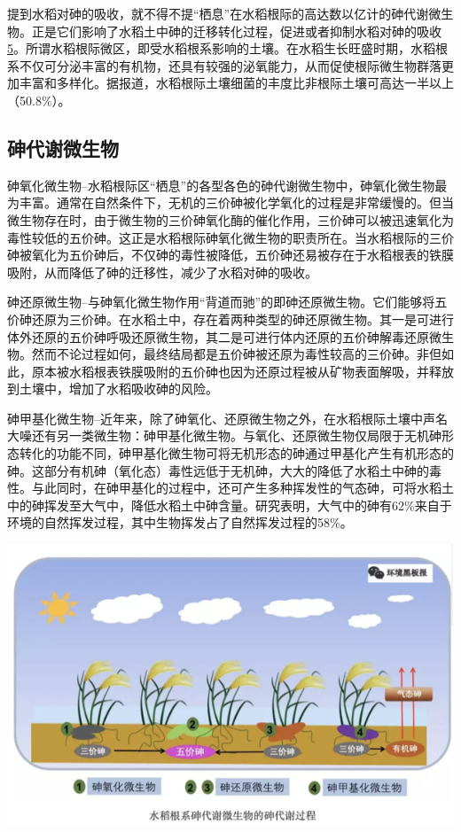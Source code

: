 \documentclass[]{book}
\begin{document}
提到水稻对砷的吸收，就不得不提``栖息''在水稻根际的高达数以亿计的砷代谢微生物。正是它们影响了水稻土中砷的迁移转化过程，促进或者抑制水稻对砷的吸收\href{Bi\%20H,\%20Huang\%20X,\%20et\%20al.\%20Small\%202014,\%2010,\%203544.}{5}。所谓水稻根际微区，即受水稻根系影响的土壤。在水稻生长旺盛时期，水稻根系不仅可分泌丰富的有机物，还具有较强的泌氧能力，从而促使根际微生物群落更加丰富和多样化。据报道，水稻根际土壤细菌的丰度比非根际土壤可高达一半以上（50.8\%）。

\subsection{砷代谢微生物}

砷氧化微生物--水稻根际区``栖息''的各型各色的砷代谢微生物中，砷氧化微生物最为丰富。通常在自然条件下，无机的三价砷被化学氧化的过程是非常缓慢的。但当微生物存在时，由于微生物的三价砷氧化酶的催化作用，三价砷可以被迅速氧化为毒性较低的五价砷。这正是水稻根际砷氧化微生物的职责所在。当水稻根际的三价砷被氧化为五价砷后，不仅砷的毒性被降低，五价砷还易被存在于水稻根表的铁膜吸附，从而降低了砷的迁移性，减少了水稻对砷的吸收。

砷还原微生物--与砷氧化微生物作用``背道而驰''的即砷还原微生物。它们能够将五价砷还原为三价砷。在水稻土中，存在着两种类型的砷还原微生物。其一是可进行体外还原的五价砷呼吸还原微生物，其二是可进行体内还原的五价砷解毒还原微生物。然而不论过程如何，最终结局都是五价砷被还原为毒性较高的三价砷。非但如此，原本被水稻根表铁膜吸附的五价砷也因为还原过程被从矿物表面解吸，并释放到土壤中，增加了水稻吸收砷的风险。

砷甲基化微生物--近年来，除了砷氧化、还原微生物之外，在水稻根际土壤中声名大噪还有另一类微生物：砷甲基化微生物。与氧化、还原微生物仅局限于无机砷形态转化的功能不同，砷甲基化微生物可将无机形态的砷通过甲基化产生有机形态的砷。这部分有机砷（氧化态）毒性远低于无机砷，大大的降低了水稻土中砷的毒性。与此同时，在砷甲基化的过程中，还可产生多种挥发性的气态砷，可将水稻土中的砷挥发至大气中，降低水稻土中砷含量。研究表明，大气中的砷有62\%来自于环境的自然挥发过程，其中生物挥发占了自然挥发过程的58\%。

\includegraphics[width=8.33in]{images/as4}
\end{document}
